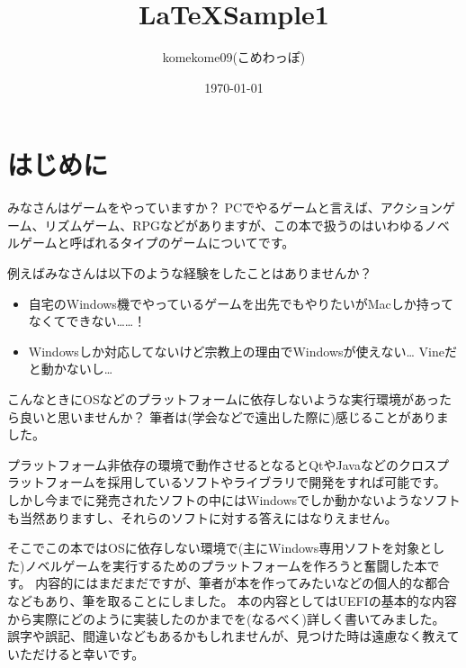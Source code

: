 \documentclass[10pt, b5paper, openany]{ltjsbook}
\title{ \LaTeX Sample1 }
\author{ komekome09(こめわっぽ) }
\date{ \today }
\begin{document}
\chapter*{はじめに}
みなさんはゲームをやっていますか？
PCでやるゲームと言えば、アクションゲーム、リズムゲーム、RPGなどがありますが、この本で扱うのはいわゆるノベルゲームと呼ばれるタイプのゲームについてです。

例えばみなさんは以下のような経験をしたことはありませんか？
\begin{itemize}
    \item 自宅のWindows機でやっているゲームを出先でもやりたいがMacしか持ってなくてできない……！
    \item Windowsしか対応してないけど宗教上の理由でWindowsが使えない… Vineだと動かないし…
\end{itemize}
こんなときにOSなどのプラットフォームに依存しないような実行環境があったら良いと思いませんか？
筆者は(学会などで遠出した際に)感じることがありました。

プラットフォーム非依存の環境で動作させるとなるとQtやJavaなどのクロスプラットフォームを採用しているソフトやライブラリで開発をすれば可能です。
しかし今までに発売されたソフトの中にはWindowsでしか動かないようなソフトも当然ありますし、それらのソフトに対する答えにはなりえません。

そこでこの本ではOSに依存しない環境で(主にWindows専用ソフトを対象とした)ノベルゲームを実行するためのプラットフォームを作ろうと奮闘した本です。
内容的にはまだまだですが、筆者が本を作ってみたいなどの個人的な都合などもあり、筆を取ることにしました。
本の内容としてはUEFIの基本的な内容から実際にどのように実装したのかまでを(なるべく)詳しく書いてみました。
誤字や誤記、間違いなどもあるかもしれませんが、見つけた時は遠慮なく教えていただけると幸いです。

\tableofcontents
\clearpage
\end{document}
